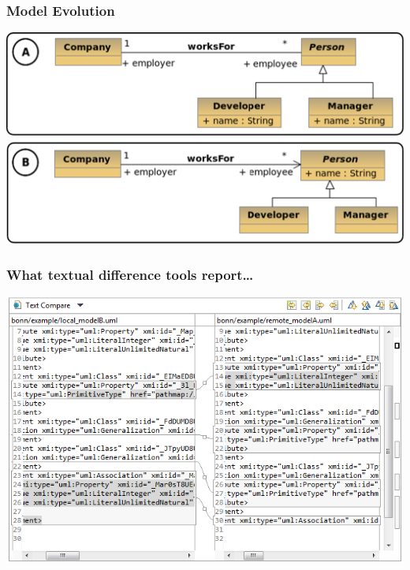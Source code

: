 \begin{frame}
  \frametitle{Model Evolution}
  \begin{center}
  \includegraphics[scale=0.4]{images/uml_example_04}
  \end{center}
\end{frame}

\begin{frame}
  \frametitle{What textual difference tools report\ldots}
  \begin{center}
  \includegraphics[scale=0.55]{images/text_compare}
  \end{center}
\end{frame}

